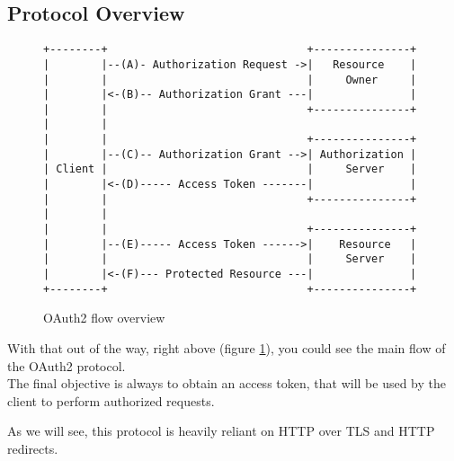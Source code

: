 \subsection{Protocol Overview}
\begin{figure}[h]
    \centering
    \begin{BVerbatim}
+--------+                               +---------------+
|        |--(A)- Authorization Request ->|   Resource    |
|        |                               |     Owner     |
|        |<-(B)-- Authorization Grant ---|               |
|        |                               +---------------+
|        |
|        |                               +---------------+
|        |--(C)-- Authorization Grant -->| Authorization |
| Client |                               |     Server    |
|        |<-(D)----- Access Token -------|               |
|        |                               +---------------+
|        |
|        |                               +---------------+
|        |--(E)----- Access Token ------>|    Resource   |
|        |                               |     Server    |
|        |<-(F)--- Protected Resource ---|               |
+--------+                               +---------------+
    \end{BVerbatim}
    \caption{OAuth2 flow overview \cite{ietf-oauth}}
    \label{fig:oauth-flow-overview}
\end{figure}

With that out of the way, right above (figure \ref{fig:oauth-flow-overview}),
you could see the main flow of the OAuth2 protocol.
\\
The final objective is always to obtain an access token, that will be used by
the client to perform authorized requests.

As we will see, this protocol is heavily reliant on HTTP over TLS
\cite{ietf-https} and HTTP redirects.


